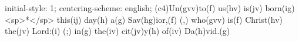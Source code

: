 initial-style: 1;
centering-scheme: english;
(c4)Un(gvv)to(f) us(hv) is(jv) born(ig) <sp>*</sp> this(ij) day(h) a(g) Sav(hg)ior,(f) (,) who(gvv) is(f) Christ(hv) the(jv) Lord:(i) (;) in(g) the(iv) cit(jv)y(h) of(iv) Da(h)vid.(g)
